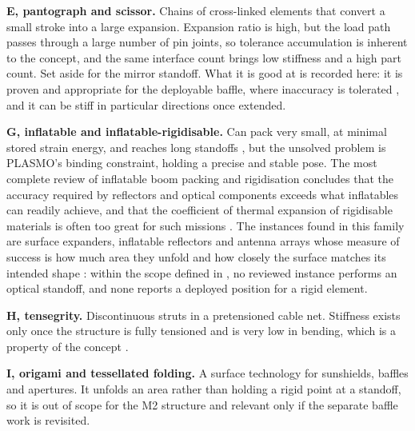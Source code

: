 \textbf{E, pantograph and scissor.} Chains of cross-linked elements that convert a small stroke into a large expansion. Expansion ratio is high, but the load path passes through a large number of pin joints, so tolerance accumulation is inherent to the concept, and the same interface count brings low stiffness and a high part count. Set aside for the mirror standoff. What it is good at is recorded here: it is proven and appropriate for the deployable baffle, where inaccuracy is tolerated \cite{nagy_design_2021}, and it can be stiff in particular directions once extended.

\textbf{G, inflatable and inflatable-rigidisable.} Can pack very small, at minimal stored strain energy, and reaches long standoffs \cite{schenk_review_2014}, but the unsolved problem is PLASMO's binding constraint, holding a precise and stable pose. The most complete review of inflatable boom packing and rigidisation concludes that the accuracy required by reflectors and optical components exceeds what inflatables can readily achieve, and that the coefficient of thermal expansion of rigidisable materials is often too great for such missions \cite{schenk_review_2014}. The instances found in this family are surface expanders, inflatable reflectors and antenna arrays whose measure of success is how much area they unfold and how closely the surface matches its intended shape \cite{freeland_large_1997, huang_development_2001, kamaliya_inflatable_2023}: within the scope defined in , no reviewed instance performs an optical standoff, and none reports a deployed position for a rigid element.

\textbf{H, tensegrity.} Discontinuous struts in a pretensioned cable net. Stiffness exists only once the structure is fully tensioned and is very low in bending, which is a property of the concept \cite{tibert_deployable_2002}.

\textbf{I, origami and tessellated folding.} A surface technology for sunshields, baffles and apertures. It unfolds an area rather than holding a rigid point at a standoff, so it is out of scope for the M2 structure and relevant only if the separate baffle work is revisited.



